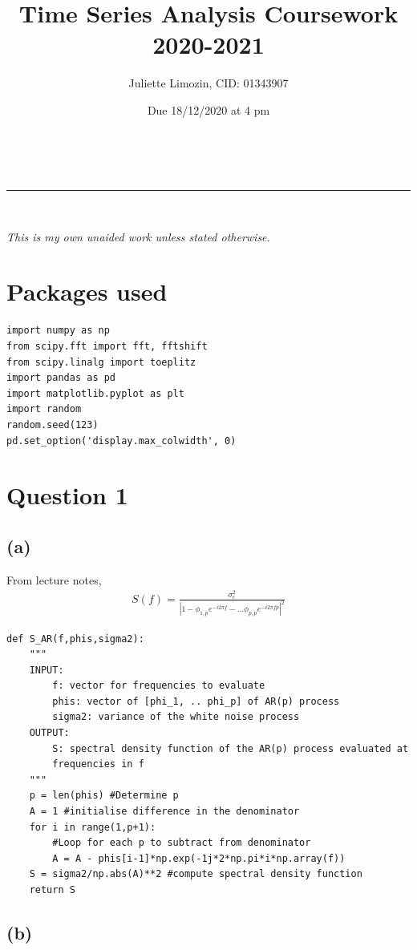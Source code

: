 \documentclass[a4paper,10pt]{article}
\makeatletter
\newcommand{\linia}{\rule{\linewidth}{0.5pt}}
\theoremstyle{mytheor}
\renewcommand{\maketitle}{
\begin{center}
\vspace{2ex}
{\huge \textsc{\@title}}
\vspace{1ex}
\\
\linia\\
\@author \hfill \@date
\vspace{1ex}
\end{center}
}
\makeatother
\begin{document}
\title{Time Series Analysis Coursework 2020-2021}

\author{Juliette Limozin, CID: 01343907}

\date{Due 18/12/2020 at 4 pm}

\maketitle

\textit{This is my own unaided work unless stated otherwise.} 

\section*{Packages used}

\begin{lstlisting}
import numpy as np
from scipy.fft import fft, fftshift
from scipy.linalg import toeplitz
import pandas as pd
import matplotlib.pyplot as plt
import random
random.seed(123)
pd.set_option('display.max_colwidth', 0)
\end{lstlisting}
\section*{Question 1}
\subsection*{(a)}

From lecture notes,
\begin{align*}
    S(f) = \frac{\sigma _\epsilon ^2}{|1-\phi _{1,p}e^{-i2\pi f} - ...\phi _{p,p}e^{-i2\pi fp}|^2}
\end{align*}
\begin{lstlisting}
def S_AR(f,phis,sigma2):
    """
    INPUT:
        f: vector for frequencies to evaluate 
        phis: vector of [phi_1, .. phi_p] of AR(p) process
        sigma2: variance of the white noise process
    OUTPUT:
        S: spectral density function of the AR(p) process evaluated at
        frequencies in f
    """
    p = len(phis) #Determine p
    A = 1 #initialise difference in the denominator
    for i in range(1,p+1):
        #Loop for each p to subtract from denominator
        A = A - phis[i-1]*np.exp(-1j*2*np.pi*i*np.array(f)) 
    S = sigma2/np.abs(A)**2 #compute spectral density function
    return S
\end{lstlisting}

\subsection*{(b)}
\end{document}
